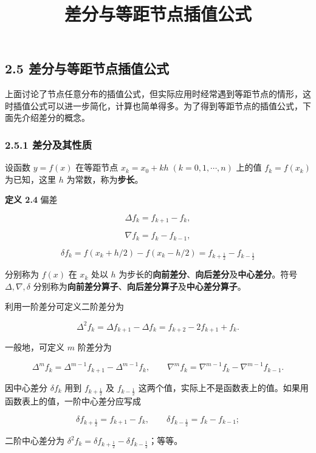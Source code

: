 \documentclass[
  10pt,
  fontset=fandol]{ctexart}
\title{差分与等距节点插值公式}
\author{}
\date{}
\begin{document}
\maketitle

\subsection{2.5 差分与等距节点插值公式}\label{ux5deeux5206ux4e0eux7b49ux8dddux8282ux70b9ux63d2ux503cux516cux5f0f}

上面讨论了节点任意分布的插值公式，但实际应用时经常遇到等距节点的情形，这时插值公式可以进一步简化，计算也简单得多。为了得到等距节点的插值公式，下面先介绍差分的概念。

\subsubsection{2.5.1 差分及其性质}\label{ux5deeux5206ux53caux5176ux6027ux8d28}

设函数 \(y=f(x)\) 在等距节点 \(x_k=x_0+kh\;(k=0,1,\cdots,n)\) 上的值 \(f_k=f(x_k)\) 为已知，这里 \(h\) 为常数，称为\textbf{步长}。

\textbf{定义 2.4} 偏差

\[
\Delta f_k=f_{k+1}-f_k,
\tag{2.5.1}
\]

\[
\nabla f_k=f_k-f_{k-1},
\tag{2.5.2}
\]

\[
\delta f_k=f(x_k+h/2)-f(x_k-h/2)=f_{k+\frac12}-f_{k-\frac12}
\tag{2.5.3}
\]

分别称为 \(f(x)\) 在 \(x_k\) 处以 \(h\) 为步长的\textbf{向前差分}、\textbf{向后差分}及\textbf{中心差分}。符号 \(\Delta,\nabla,\delta\) 分别称为\textbf{向前差分算子}、\textbf{向后差分算子}及\textbf{中心差分算子}。

利用一阶差分可定义二阶差分为

\[
\Delta^2 f_k=\Delta f_{k+1}-\Delta f_k=f_{k+2}-2f_{k+1}+f_k.
\]

一般地，可定义 \(m\) 阶差分为

\[
\Delta^m f_k=\Delta^{m-1}f_{k+1}-\Delta^{m-1}f_k,\qquad
\nabla^m f_k=\nabla^{m-1}f_k-\nabla^{m-1}f_{k-1}.
\]

因中心差分 \(\delta f_k\) 用到 \(f_{k+\frac12}\) 及 \(f_{k-\frac12}\) 这两个值，实际上不是函数表上的值。如果用函数表上的值，一阶中心差分应写成

\[
\delta f_{k+\frac12}=f_{k+1}-f_k,\qquad
\delta f_{k-\frac12}=f_k-f_{k-1};
\]

二阶中心差分为 \(\delta^2 f_k=\delta f_{k+\frac12}-\delta f_{k-\frac12}\)；等等。
\end{document}
